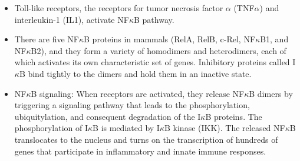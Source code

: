 \documentclass{report}
\begin{document}
\begin{enumerate}
\begin{itemize}
	\item Toll-like receptors, the receptors for tumor necrosis factor $\alpha$ (TNF$\alpha$) and interleukin-1 (IL1), activate NF$\kappa$B pathway. 

	\item There are five NF$\kappa$B proteins in mammals (RelA, RelB, c-Rel, NF$\kappa$B1, and NF$\kappa$B2), and they form a variety of homodimers and heterodimers, each of which activates its own characteristic set of genes. Inhibitory proteins called I$\kappa$B bind tightly to the dimers and hold them in an inactive state.

	\item NF$\kappa$B signaling: When receptors are activated, they release NF$\kappa$B dimers by triggering a signaling pathway that leads to the phosphorylation, ubiquitylation, and consequent degradation of the I$\kappa$B proteins. The phosphorylation of I$\kappa$B is mediated by I$\kappa$B kinase (IKK). The released NF$\kappa$B translocates to the nucleus and turns on the transcription of hundreds of genes that participate in inflammatory and innate immune responses. 
\end{itemize}

\end{enumerate}
\end{document}
